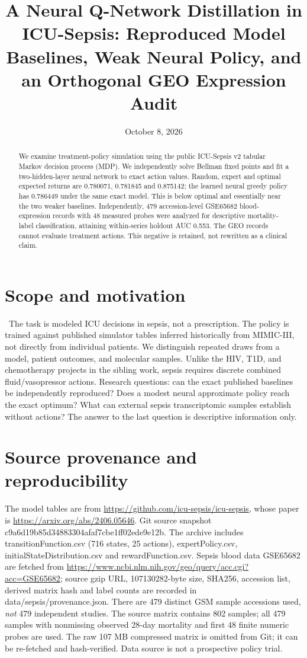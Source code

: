
\title{A Neural Q-Network Distillation in ICU-Sepsis: Reproduced Model Baselines, Weak Neural Policy, and an Orthogonal GEO Expression Audit}
\date{October 8, 2026}
\maketitle
\begin{abstract}
We examine treatment-policy simulation using the public ICU-Sepsis v2 tabular Markov decision process (MDP). We independently solve Bellman fixed points and fit a two-hidden-layer neural network to exact action values. Random, expert and optimal expected returns are 0.780071, 0.781845 and 0.875142; the learned neural greedy policy has 0.786449 under the same exact model. This is below optimal and essentially near the two weaker baselines. Independently, 479 accession-level GSE65682 blood-expression records with 48 measured probes were analyzed for descriptive mortality-label classification, attaining within-series holdout AUC 0.553. The GEO records cannot evaluate treatment actions. This negative is retained, not rewritten as a clinical claim.
\end{abstract}
\section{Scope and motivation}
\caution\ The task is modeled ICU decisions in sepsis, not a prescription. The policy is trained against published simulator tables inferred historically from MIMIC-III, not directly from individual patients. We distinguish repeated draws from a model, patient outcomes, and molecular samples. Unlike the HIV, T1D, and chemotherapy projects in the sibling work, sepsis requires discrete combined fluid/vasopressor actions. Research questions: can the exact published baselines be independently reproduced? Does a modest neural approximate policy reach the exact optimum? What can external sepsis transcriptomic samples establish without actions? The answer to the last question is descriptive information only.
\section{Source provenance and reproducibility}
The model tables are from \url{https://github.com/icu-sepsis/icu-sepsis}, whose paper is \url{https://arxiv.org/abs/2406.05646}. Git source snapshot c9a6d19b85d34883304afaf7cbe1ff02ede9e12b. The archive includes transitionFunction.csv (716 states, 25 actions), expertPolicy.csv, initialStateDistribution.csv and rewardFunction.csv. Sepsis blood data GSE65682 are fetched from \url{https://www.ncbi.nlm.nih.gov/geo/query/acc.cgi?acc=GSE65682}; source gzip URL, 107130282-byte size, SHA256, accession list, derived matrix hash and label counts are recorded in data/sepsis/provenance.json. There are 479 distinct GSM sample accessions used, \emph{not} 479 independent studies. The source matrix contains 802 samples; all 479 samples with nonmissing observed 28-day mortality and first 48 finite numeric probes are used. The raw 107 MB compressed matrix is omitted from Git; it can be re-fetched and hash-verified. Data source is not a prospective policy trial.
